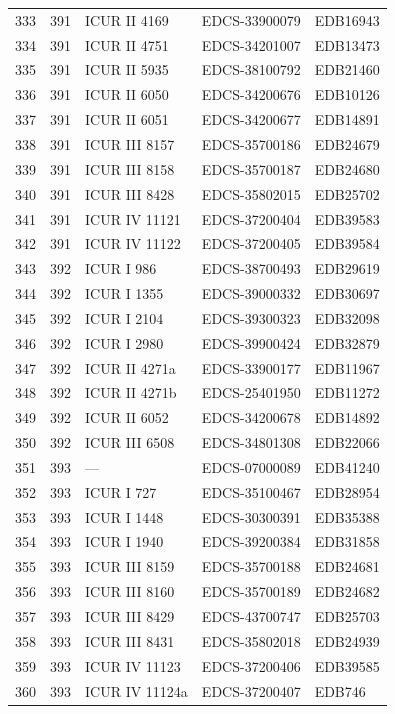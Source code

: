 \begin{longtable}{@{}r r l l l@{}}
333 & 391 & ICUR II 4169 & EDCS-33900079 & EDB16943 \\
334 & 391 & ICUR II 4751 & EDCS-34201007 & EDB13473 \\
335 & 391 & ICUR II 5935 & EDCS-38100792 & EDB21460 \\
336 & 391 & ICUR II 6050 & EDCS-34200676 & EDB10126 \\
337 & 391 & ICUR II 6051 & EDCS-34200677 & EDB14891 \\
338 & 391 & ICUR III 8157 & EDCS-35700186 & EDB24679 \\
339 & 391 & ICUR III 8158 & EDCS-35700187 & EDB24680 \\
340 & 391 & ICUR III 8428 & EDCS-35802015 & EDB25702 \\
341 & 391 & ICUR IV 11121 & EDCS-37200404 & EDB39583 \\
342 & 391 & ICUR IV 11122 & EDCS-37200405 & EDB39584 \\
343 & 392 & ICUR I 986 & EDCS-38700493 & EDB29619 \\
344 & 392 & ICUR I 1355 & EDCS-39000332 & EDB30697 \\
345 & 392 & ICUR I 2104 & EDCS-39300323 & EDB32098 \\
346 & 392 & ICUR I 2980 & EDCS-39900424 & EDB32879 \\
347 & 392 & ICUR II 4271a & EDCS-33900177 & EDB11967 \\
348 & 392 & ICUR II 4271b & EDCS-25401950 & EDB11272 \\
349 & 392 & ICUR II 6052 & EDCS-34200678 & EDB14892 \\
350 & 392 & ICUR III 6508 & EDCS-34801308 & EDB22066 \\
351 & 393 & — & EDCS-07000089 & EDB41240 \\
352 & 393 & ICUR I 727 & EDCS-35100467 & EDB28954 \\
353 & 393 & ICUR I 1448 & EDCS-30300391 & EDB35388 \\
354 & 393 & ICUR I 1940 & EDCS-39200384 & EDB31858 \\
355 & 393 & ICUR III 8159 & EDCS-35700188 & EDB24681 \\
356 & 393 & ICUR III 8160 & EDCS-35700189 & EDB24682 \\
357 & 393 & ICUR III 8429 & EDCS-43700747 & EDB25703 \\
358 & 393 & ICUR III 8431 & EDCS-35802018 & EDB24939 \\
359 & 393 & ICUR IV 11123 & EDCS-37200406 & EDB39585 \\
360 & 393 & ICUR IV 11124a & EDCS-37200407 & EDB746 \\

\end{longtable}
